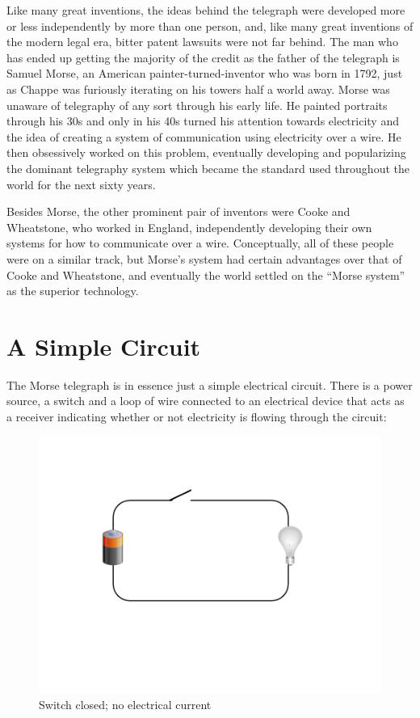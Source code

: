 \documentclass[UTF8]{book}
\begin{document}
\begin{CJK}{UTF8}{gbsn}
Like many great inventions, the ideas behind the telegraph were developed more or less independently by more than one person, and, like many great inventions of the modern legal era, bitter patent lawsuits were not far behind. The man who has ended up getting the majority of the credit as the father of the telegraph is Samuel Morse, an American painter-turned-inventor who was born in 1792, just as Chappe was furiously iterating on his towers half a world away. Morse was unaware of telegraphy of any sort through his early life. He painted portraits through his 30s and only in his 40s turned his attention towards electricity and the idea of creating a system of communication using electricity over a wire. He then obsessively worked on this problem, eventually developing and popularizing the dominant telegraphy system which became the standard used throughout the world for the next sixty years.

Besides Morse, the other prominent pair of inventors were Cooke and Wheatstone, who worked in England, independently developing their own systems for how to communicate over a wire. Conceptually, all of these people were on a similar track, but Morse's system had certain advantages over that of Cooke and Wheatstone, and eventually the world settled on the ``Morse system'' as the superior technology.

\section{A Simple Circuit}

The Morse telegraph is in essence just a simple electrical circuit. There is a power source, a switch and a loop of wire connected to an electrical device that acts as a receiver indicating whether or not electricity is flowing through the circuit:

\begin{figure}[H]
\centering
\includegraphics[width=0.8\linewidth]{circuit1}
\caption{Switch closed; no electrical current}
\end{figure}


\end{CJK}
\end{document}
